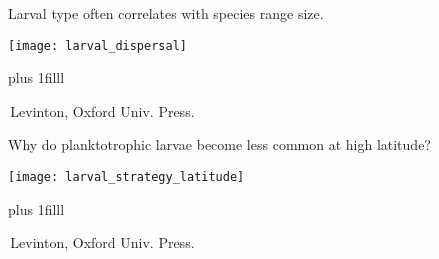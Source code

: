 \documentclass[t]{beamer}
\begin{document}
\begin{frame}[t]{Larval type often correlates with species range size.}

\texttt{[image: larval\_dispersal]}

\vskip0pt plus 1filll

\tiny \textcopyright\,Levinton, Oxford Univ. Press.
\end{frame}

\begin{frame}[t]{Why do planktotrophic larvae become less common at high latitude?}

\texttt{[image: larval\_strategy\_latitude]}

\vskip0pt plus 1filll

\tiny \textcopyright\,Levinton, Oxford Univ. Press.
\end{frame}
\end{document}
